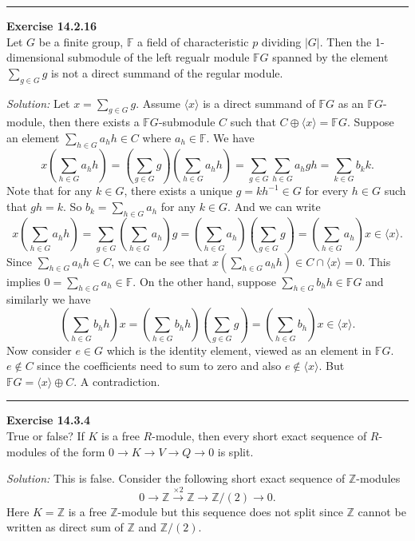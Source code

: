 \documentclass[a4paper, 12pt]{article}
\newenvironment{problem}[2][Exercise]
    { \begin{mdframed}[backgroundcolor=gray!20] \textbf{#1 #2} \\}
    {  \end{mdframed}}
\newenvironment{solution}
    {\textit{Solution:}}
    {}
\newcommand{\la}{\langle}
\newcommand{\ra}{\rangle}
\begin{document}
\noindent\rule{7in}{2.8pt}
\begin{problem}{14.2.16}
Let \(G\) be a finite group, \(\mathbb{F}\) a field of characteristic \(p\) dividing \(|G|\). Then the 1-dimensional submodule of the left regualr module \(\mathbb{F}G\) spanned by 
the element \(\sum_{g\in G}g\) is not a direct summand of the regular module.
\end{problem}
\begin{solution}
Let \(x=\sum_{g\in G}g\). Assume \(\la x\ra \) is a direct summand of \(\mathbb{F}G\) as an \(\mathbb{F}G\)-module, then there exists a \(\mathbb{F}G\)-submodule \(C\) such that \(C\oplus \la x\ra=\mathbb{F}G\). Suppose an element \(\sum_{h\in G}a_h h\in C\) where \(a_h\in \mathbb{F}\). We have 
\[x(\sum_{h\in G}a_h h)=(\sum_{g\in G}g)(\sum_{h\in G}a_h h)=\sum_{g\in G}\sum_{h\in G}a_h gh=\sum_{k\in G}b_k k.\]
Note that for any \(k\in G\), there exists a unique \(g=kh^{-1}\in G\) for every \(h\in G\) such that \(gh=k\). So \(b_k=\sum_{h\in G}a_h\) for any \(k\in G\). And we can write  
\[x(\sum_{h\in G}a_h h)=\sum_{g\in G}(\sum_{h\in G}a_h)g=(\sum_{h\in G}a_h)(\sum_{g\in G}g)=(\sum_{h\in G}a_h)x\in \la x\ra.\]
Since \(\sum_{h\in G}a_h h\in C\), we can be see that \(x(\sum_{h\in G}a_h h)\in C\cap \la x\ra=0\). This implies \(0=\sum_{h\in G}a_h\in \mathbb{F}\). 
On the other hand, suppose \(\sum_{h\in G}b_h h\in \mathbb{F}G\) and similarly we have 
\[(\sum_{h\in G}b_h h)x=(\sum_{h\in G}b_h h)(\sum_{g\in G} g)=(\sum_{h\in G}b_h)x\in \la x\ra.\]
Now consider \(e\in G\) which is the identity element, viewed as an element in \(\mathbb{F}G\). \(e\notin C\) since the coefficients need to sum to zero and also \(e\notin \la x \ra\). But \(\mathbb{F}G=\la x\ra \oplus C\). A contradiction.
\end{solution}

\noindent\rule{7in}{2.8pt}
\begin{problem}{14.3.4}
True or false? If \(K\) is a free \(R\)-module, then every short exact sequence of \(R\)-modules of the form \(0\rightarrow K\rightarrow V\rightarrow Q\rightarrow 0\) is split.
\end{problem}
\begin{solution}
This is false. Consider the following short exact sequence of \(\mathbb{Z}\)-modules 
\[0\rightarrow \mathbb{Z}\xrightarrow{\times 2}\mathbb{Z}\rightarrow \mathbb{Z}/(2)\rightarrow 0.\]
Here \(K=\mathbb{Z}\) is a free \(\mathbb{Z}\)-module but this sequence does not split since \(\mathbb{Z}\) cannot be written as direct sum of \(\mathbb{Z}\) and \(\mathbb{Z}/(2)\).
\end{solution}
\end{document}
